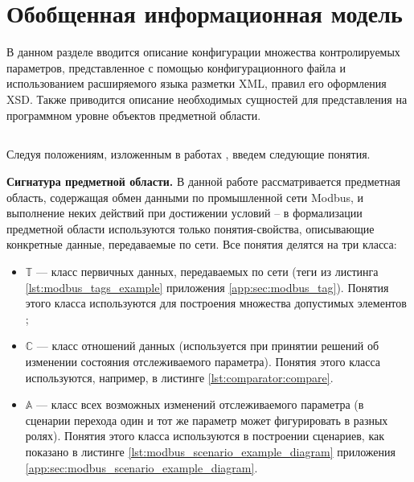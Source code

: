 \chapter{Обобщенная информационная модель}
В данном разделе вводится описание конфигурации множества контролируемых параметров,
представленное с помощью конфигурационного файла и использованием расширяемого языка разметки XML, правил его оформления XSD.
Также приводится описание необходимых сущностей для представления
на программном уровне объектов предметной области.


\section{}\label{sec:ontology}
Следуя положениям, изложенным в работах \cite{journal:vestnic_novosib:palchunov, journal:naukovedenie:serdukov},
введем следующие понятия.

\textbf{Сигнатура предметной области.}
В данной работе рассматривается предметная область, содержащая обмен данными по промышленной сети Modbus,
и выполнение неких действий при достижении условий -- в формализации предметной области используются только понятия-свойства,
описывающие конкретные данные, передаваемые по сети. Все понятия делятся на три класса:


\begin{itemize}
    \item $\mathbb{T}$ --- класс первичных данных, передаваемых по сети (теги из листинга \ref{lst:modbus_tags_example} приложения \ref{app:sec:modbus_tag}).
        Понятия этого класса используются для построения множества допустимых элементов ;
    \item $\mathbb{C}$ --- класс отношений данных (используется при принятии решений об изменении состояния отслеживаемого параметра).
        Понятия этого класса используются, например, в листинге \ref{lst:comparator:compare}.
    \item $\mathbb{A}$ --- класс всех возможных изменений отслеживаемого параметра (в сценарии перехода один и тот же параметр может фигурировать в разных ролях).
        Понятия этого класса используются в построении сценариев, как показано в листинге \ref{lst:modbus_scenario_example_diagram} приложения \ref{app:sec:modbus_scenario_example_diagram}.
\end{itemize}

